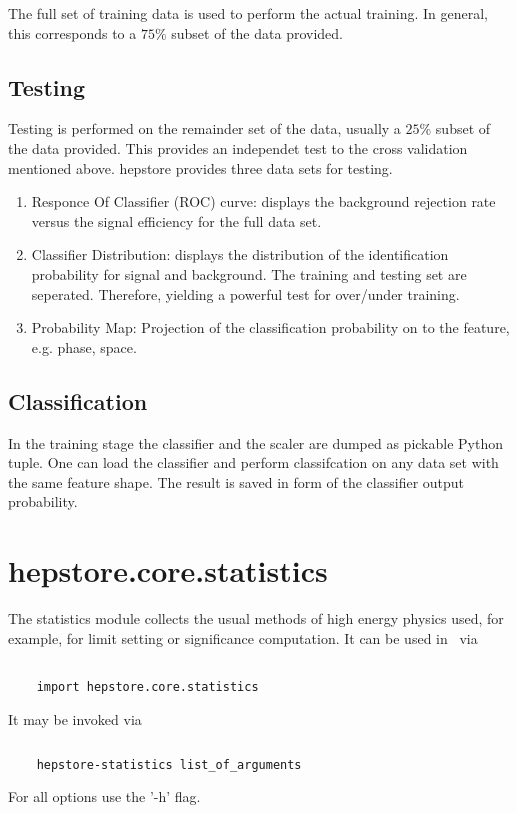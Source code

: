 The full set of training data is used to perform the actual
training. In general, this corresponds to a $75\%$ subset of the data
provided.

\subsection{Testing}

Testing is performed on the remainder set of the data, usually a
$25\%$ subset of the data provided. This provides an independet test
to the cross validation mentioned above. hepstore provides three data
sets for testing.
%
\begin{enumerate}
\item Responce Of Classifier (ROC) curve: displays the background
  rejection rate versus the signal efficiency for the full data set.
\item Classifier Distribution: displays the distribution of the
  identification probability for signal and background. The training
  and testing set are seperated. Therefore, yielding a powerful test
  for over/under training.
\item Probability Map: Projection of the classification probability on
  to the feature, e.g. phase, space.
\end{enumerate}
%

\subsection{Classification}

In the training stage the classifier and the scaler are dumped as
pickable Python tuple. One can load the classifier and perform
classifcation on any data set with the same feature shape. The result
is saved in form of the classifier output probability.

\section{hepstore.core.statistics}

The statistics module collects the usual methods of high energy
physics used, for example, for limit setting or significance
computation. It can be used in \python~via
%
\begin{changemargin}{1.5cm}{1.5cm}
  \centering
  \begin{lstlisting}
    
    import hepstore.core.statistics
  \end{lstlisting}
\end{changemargin}
%
It may be invoked via
%
\begin{changemargin}{1.5cm}{1.5cm}
  \centering
  \begin{lstlisting}[language=Bash]
    
    hepstore-statistics list_of_arguments
  \end{lstlisting}
\end{changemargin}
%
For all options use the '-h' flag.

